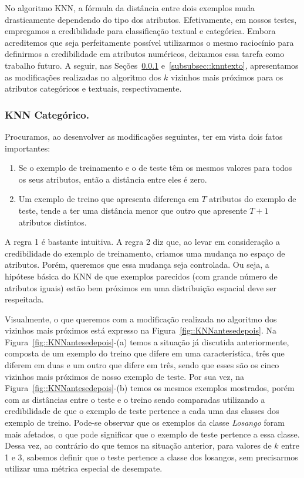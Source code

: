 No algoritmo \textsc{KNN}, a fórmula da distância entre dois exemplos muda drasticamente dependendo do tipo dos atributos.
Efetivamente, em nossos testes, empregamos a credibilidade para classificação textual e categórica. Embora acreditemos que seja perfeitamente possível utilizarmos o mesmo raciocínio para definirmos a credibilidade em atributos numéricos, deixamos essa tarefa como trabalho futuro. A seguir, nas Seções~\ref{subsubsec::knncat} e~\ref{subsubsec::knntexto}, apresentamos as modificações realizadas no algoritmo dos $k$ vizinhos mais próximos para os atributos categóricos e textuais, respectivamente.

\subsubsection{\textsc{KNN} Categórico.}
\label{subsubsec::knncat}

Procuramos, ao desenvolver as modificações seguintes, ter em vista dois fatos importantes:
\begin{enumerate}
\item Se o exemplo de treinamento e o de teste têm os mesmos valores para todos os seus atributos, então a distância entre eles é zero. 
\item Um exemplo de treino que apresenta diferença em $T$ atributos do exemplo de teste, tende a ter uma distância menor que outro que apresente $T+1$ atributos distintos.
\end{enumerate}

A regra 1 é bastante intuitiva. A regra 2 diz que, ao levar em consideração a credibilidade do exemplo de treinamento, criamos uma mudança no espaço de atributos. Porém, queremos que essa mudança seja controlada. Ou seja, a hipótese básica do \textsc{KNN} de que exemplos parecidos (com grande número de atributos iguais) estão bem próximos em uma distribuição espacial deve ser respeitada.

Visualmente, o que queremos com a modificação realizada no algoritmo dos vizinhos mais próximos está expresso na Figura~\ref{fig::KNNantesedepois}. Na Figura~\ref{fig::KNNantesedepois}-(a) temos a situação já discutida anteriormente, composta de um exemplo do treino que difere em uma característica, três que diferem em duas e um outro que difere em três, sendo que esses são os cinco vizinhos mais próximos de nosso exemplo de teste. Por sua vez, na Figura~\ref{fig::KNNantesedepois}-(b) temos os mesmos exemplos mostrados, porém com as distâncias entre o teste e o treino sendo comparadas utilizando a credibilidade de que o exemplo de teste pertence a cada uma das classes dos exemplo de treino. 
Pode-se observar que os exemplos da classe \textit{Losango} foram mais afetados, o que pode significar que o exemplo de teste pertence a essa classe. Dessa vez, ao contrário do que temos na situação anterior, para valores de $k$ entre 1 e 3, sabemos definir que o teste pertence a classe dos losangos, sem precisarmos utilizar uma métrica especial de desempate. 

